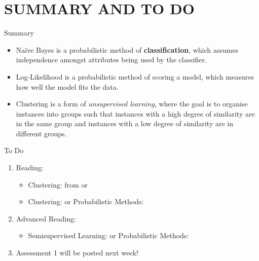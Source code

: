 \documentclass[handout]{beamer}
\begin{document}
\section*{SUMMARY AND TO DO}
\begin{frame}{Summary}
\begin{itemize}
\item Na\"{i}ve Bayes is a probabilistic method of \textbf{classification}, which assumes independence amongst attributes being used by the classifier.
\item Log-Likelihood is a probabilistic method of scoring a model, which measures how well the model fits the data.
\item Clustering is a form of \emph{unsupervised learning}, where the goal is to organise instances into groups such that instances with a high degree of similarity are in the same group and instances with a low degree of similarity are in different groups.
\end{itemize}
\end{frame}
\begin{frame}{To Do}
\begin{enumerate}
\item Reading:
	\begin{itemize}
	\item Clustering: from \cite[ch 4.8]{WFH3:2011} or \cite[ch 4.8]{WFH4:2016}
	\item Clustering: \cite[ch 6.8]{WFH3:2011} or Probabilistic Methods: \cite[ch 9.1-9.3;9.5]{WFH4:2016}
	\end{itemize}
\item Advanced Reading:
	\begin{itemize}
	\item Semisupervised Learning: \cite[ch 6.9]{WFH3:2011} or Probabilistic Methods: \cite[ch 9.4,9.6-9.8]{WFH4:2016}
	\end{itemize}
\item Assessment 1 will be posted next week!
\end{enumerate}
\end{frame}




\end{document}
